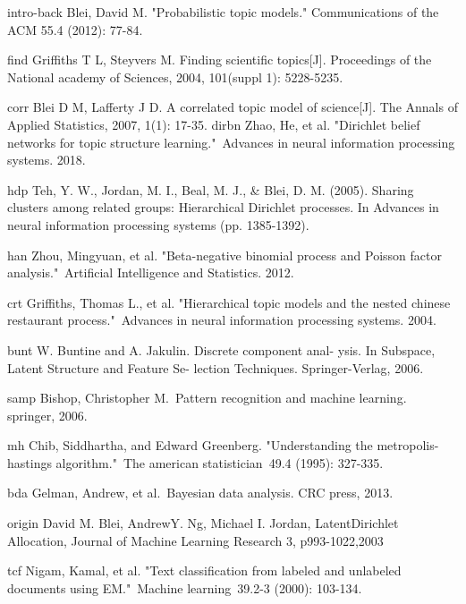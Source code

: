 \clearpage
{}

\begin{thebibliography}{999}

\bibitem
{intro-back}
Blei, David M. "Probabilistic topic models." Communications of the ACM 55.4 (2012): 77-84.

\bibitem
{find}
Griffiths T L, Steyvers M. Finding scientific topics[J]. Proceedings of the National academy of Sciences, 2004, 101(suppl 1): 5228-5235.

\bibitem
{corr}
Blei D M, Lafferty J D. A correlated topic model of science[J]. The Annals of Applied Statistics, 2007, 1(1): 17-35.
\bibitem
{dirbn}
Zhao, He, et al. "Dirichlet belief networks for topic structure learning." Advances in neural information processing systems. 2018.


\bibitem
{hdp}
Teh, Y. W., Jordan, M. I., Beal, M. J., & Blei, D. M. (2005). Sharing clusters among related groups: Hierarchical Dirichlet processes. In Advances in neural information processing systems (pp. 1385-1392).



\bibitem
{han}
Zhou, Mingyuan, et al. "Beta-negative binomial process and Poisson factor analysis." Artificial Intelligence and Statistics. 2012.

\bibitem
{crt}
Griffiths, Thomas L., et al. "Hierarchical topic models and the nested chinese restaurant process." Advances in neural information processing systems. 2004.

\bibitem
{bunt}
W. Buntine and A. Jakulin. Discrete component anal-
ysis. In Subspace, Latent Structure and Feature Se-
lection Techniques. Springer-Verlag, 2006.

\bibitem
{samp}
Bishop, Christopher M. Pattern recognition and machine learning. springer, 2006.

\bibitem
{mh}
Chib, Siddhartha, and Edward Greenberg. "Understanding the metropolis-hastings algorithm." The american statistician 49.4 (1995): 327-335.

\bibitem
{bda}
Gelman, Andrew, et al. Bayesian data analysis. CRC press, 2013.

\bibitem
{origin}
David M. Blei, AndrewY. Ng, Michael I. Jordan,  LatentDirichlet Allocation, Journal of Machine Learning Research 3, p993-1022,2003

\bibitem
{tcf}
Nigam, Kamal, et al. "Text classification from labeled and unlabeled documents using EM." Machine learning 39.2-3 (2000): 103-134.


\end{thebibliography}

